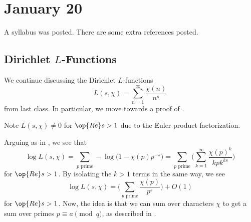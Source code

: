 \documentclass[../notes.tex]{subfiles}
\begin{document}
\section{January 20}

A syllabus was posted. There are some extra references posted.

\subsection{Dirichlet \texorpdfstring{$L$}{ L}-Functions}
We continue discussing the Dirichlet $L$-functions
\[L(s,\chi)=\sum_{n=1}^\infty\frac{\chi(n)}{n^s}\]
from last class. In particular, we move towards a proof of .
\begin{remark}
	Note $L(s,\chi)\ne0$ for $\op{Re}s>1$ due to the Euler product factorization.
\end{remark}
Arguing as in , we see that
\[\log L(s,\chi)=\sum_{p\text{ prime}}-\log\big(1-\chi(p)p^{-s}\big)=\sum_{p\text{ prime}}\Bigg(\sum_{k=1}^\infty\frac{\chi(p)^k}{kpk^{ks}}\Bigg)\]
for $\op{Re}s>1$. By isolating the $k>1$ terms in the same way, we see
\[\log L(s,\chi)=\Bigg(\sum_{p\text{ prime}}\frac{\chi(p)}{p^s}\Bigg)+O(1)\]
for $\op{Re}s>1$. Now, the idea is that we can sum over characters $\chi$ to get a sum over primes $p\equiv a\pmod q$, as described in .
\end{document}
